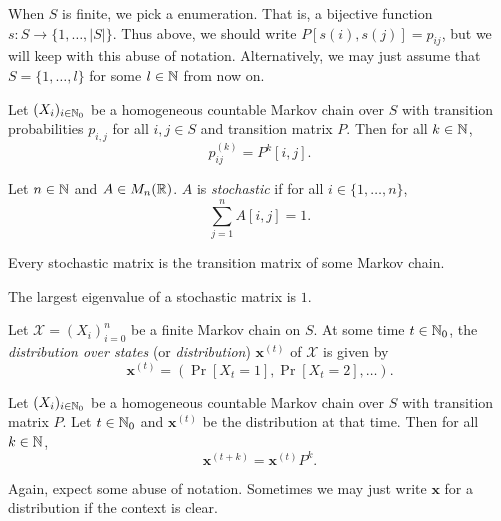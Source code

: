 \begin{remark}
    When $S$ is finite, we pick a enumeration. That is, a bijective function $s: S \to \{1, \ldots, \lvert S \rvert\}$. Thus above, we should write $P[s(i),s(j)] = p_{ij}$, but we will keep with this abuse of notation. Alternatively, we may just assume that $S = \{1, \ldots, l\}$ for some $l \in \mathbb N$ from now on.
\end{remark}

\begin{proposition}
    Let $(X_i)_{i \in \mathbb N_0}$ be a homogeneous countable Markov chain over $S$ with transition probabilities $p_{i,j}$ for all $i,j \in S$ and transition matrix $P$. Then for all $k \in \mathbb N$,
    \[ p_{ij}^{(k)} = P^k[i,j]. \]
\end{proposition}

\begin{definition}
    Let $n \in \mathbb N$ and $A \in M_n(\mathbb R)$. $A$ is \emph{stochastic} if for all $i \in \{1, \ldots, n\}$,
    \[ \sum_{j=1}^n A[i,j] = 1. \]
\end{definition}

\begin{proposition}
    Every stochastic matrix is the transition matrix of some Markov chain.
\end{proposition}

\begin{lemma}
    The largest eigenvalue of a stochastic matrix is $1$.
\end{lemma}

\begin{definition}[Distribution]
    Let $\mathcal X = (X_i)_{i=0}^n$ be a finite Markov chain on $S$. At some time $t \in \mathbb N_0$, the \emph{distribution over states} (or \emph{distribution}) $\bm x^{(t)}$ of $\mathcal X$ is given by
    \[ \bm x^{(t)} = (\Pr[X_t = 1], \Pr[X_t = 2], \ldots). \]
\end{definition}

\begin{proposition}
    Let $(X_i)_{i \in \mathbb N_0}$ be a homogeneous countable Markov chain over $S$ with transition matrix $P$. Let $t \in \mathbb N_0$ and $\bm x^{(t)}$ be the distribution at that time. Then for all $k \in \mathbb N$,
    \[ \bm x^{(t+k)} = \bm x^{(t)}P^k. \]
\end{proposition}

\begin{remark}
    Again, expect some abuse of notation. Sometimes we may just write $\bm x$ for a distribution if the context is clear.
\end{remark}

